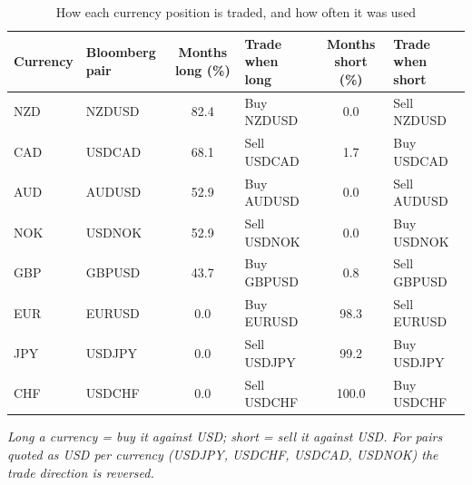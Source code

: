 \documentclass[11pt,a4paper]{article}
\begin{document}
\begin{table}[!htbp]\centering\small
\caption{How each currency position is traded, and how often it was used}\label{tab:pairs}
\begin{tabularx}{\textwidth}{llCYCY}
\toprule Currency & Bloomberg pair & Months long (\%) & Trade when long & Months short (\%) & Trade when short \\ \midrule
NZD & NZDUSD & 82.4 & Buy NZDUSD & 0.0 & Sell NZDUSD \\
CAD & USDCAD & 68.1 & Sell USDCAD & 1.7 & Buy USDCAD \\
AUD & AUDUSD & 52.9 & Buy AUDUSD & 0.0 & Sell AUDUSD \\
NOK & USDNOK & 52.9 & Sell USDNOK & 0.0 & Buy USDNOK \\
GBP & GBPUSD & 43.7 & Buy GBPUSD & 0.8 & Sell GBPUSD \\
EUR & EURUSD & 0.0 & Buy EURUSD & 98.3 & Sell EURUSD \\
JPY & USDJPY & 0.0 & Sell USDJPY & 99.2 & Buy USDJPY \\
CHF & USDCHF & 0.0 & Sell USDCHF & 100.0 & Buy USDCHF \\
\bottomrule\end{tabularx}
\par\vspace{0.3em}\footnotesize\emph{Long a currency = buy it against USD; short = sell it against USD. For pairs quoted as USD per currency (USDJPY, USDCHF, USDCAD, USDNOK) the trade direction is reversed.}
\end{table}
\end{document}
